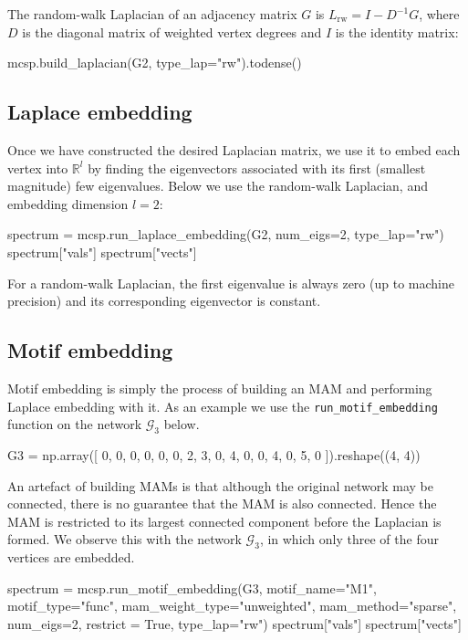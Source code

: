 \documentclass{article}
\begin{document}
The random-walk Laplacian of an adjacency matrix $G$ is
$L_\mathrm{rw} = I - D^{-1}G$,
where $D$ is the diagonal matrix of weighted vertex degrees
and $I$ is the identity matrix:

\begin{pyconsole}
mcsp.build_laplacian(G2, type_lap="rw").todense()
\end{pyconsole}

\subsection{Laplace embedding}

Once we have constructed the desired Laplacian matrix,
we use it to embed each vertex into $\mathbb{R}^l$
by finding the eigenvectors associated with
its first (smallest magnitude) few eigenvalues.
Below we use the random-walk Laplacian,
and embedding dimension $l=2$:

\begin{pyconsole}
spectrum = mcsp.run_laplace_embedding(G2, num_eigs=2, type_lap="rw")
spectrum["vals"]
spectrum["vects"]
\end{pyconsole}

For a random-walk Laplacian,
the first eigenvalue is always zero (up to machine precision)
and its corresponding eigenvector is constant.

\subsection{Motif embedding}

Motif embedding is simply the process of building an MAM
and performing Laplace embedding with it.
As an example we use the
\texttt{run\_motif\_embedding}
function on the network $\mathcal{G}_3$ below.

\begin{pyconsole}
G3 = np.array([
  0, 0, 0, 0,
  0, 0, 2, 3,
  0, 4, 0, 0,
  4, 0, 5, 0
]).reshape((4, 4))
\end{pyconsole}

An artefact of building MAMs is that although the original network may
be connected, there is no guarantee that the MAM is also connected.
Hence the MAM is restricted to its largest connected component
before the Laplacian is formed.
We observe this with the network $\mathcal{G}_3$,
in which only three of the four vertices are embedded.

\begin{pyconsole}
spectrum = mcsp.run_motif_embedding(G3, motif_name="M1", motif_type="func",
  mam_weight_type="unweighted", mam_method="sparse", num_eigs=2,
  restrict = True, type_lap="rw")
spectrum["vals"]
spectrum["vects"]
\end{pyconsole}
\end{document}
